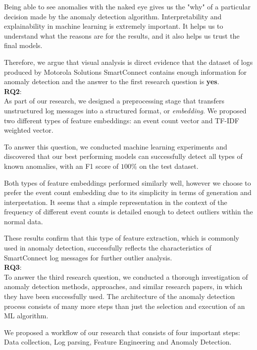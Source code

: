 Being able to see anomalies with the naked eye gives us the "why" of a particular decision made by the anomaly detection algorithm. Interpretability and explainability in machine learning is extremely important. It helps us to understand what the reasons are for the results, and it also helps us trust the final models.

Therefore, we argue that visual analysis is direct evidence that the dataset of logs produced by Motorola Solutions SmartConnect contains enough information for anomaly detection and the answer to the first research question is \textbf{yes}. \\

\textbf{RQ2}: \textit{\RQSecond}\\

As part of our research, we designed a preprocessing stage that transfers unstructured log messages into a structured format, or \textit{embedding}. We proposed two different types of feature embeddings: an event count vector and TF-IDF weighted vector.

To answer this question, we conducted machine learning experiments and discovered that our best performing models can successfully detect all types of known anomalies, with an F1 score of $100 \%$ on the test dataset.

Both types of feature embeddings performed similarly well, however we choose to prefer the event count embedding due to its simplicity in terms of generation and interpretation. It seems that a simple representation in the context of the frequency of different event counts is detailed enough to detect outliers within the normal data. 

These results confirm that this type of feature extraction, which is commonly used in anomaly detection, successfully reflects the characteristics of SmartConnect log messages for further outlier analysis.\\

\textbf{RQ3}: \textit{\RQThird}\\

To answer the third research question, we conducted a thorough investigation of anomaly detection methods, approaches, and similar research papers, in which they have been successfully used. The architecture of the anomaly detection process consists of many more steps than just the selection and execution of an ML algorithm. 

We proposed a workflow of our research that consists of four important steps: Data collection, Log parsing, Feature Engineering and Anomaly Detection.

